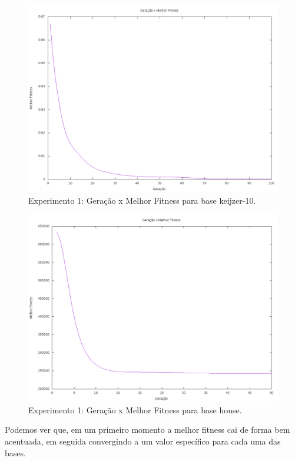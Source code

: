 \documentclass[12pt]{article}
\begin{document}
\begin{figure}[ht]
  \centering
  \includegraphics[width=1\textwidth]{exp1k10.png}
  \caption{Experimento 1: Geração x Melhor Fitness para base keijzer-10.}
  \label{fig:exp1k10}
\end{figure}

\begin{figure}[ht]
  \centering
  \includegraphics[width=1\textwidth]{exp1h.png}
  \caption{Experimento 1: Geração x Melhor Fitness para base house.}
  \label{fig:exp1h}
\end{figure}
  
Podemos ver que, em um primeiro momento a melhor fitness cai de forma bem acentuada,
em seguida convergindo a um valor específico para cada uma das bases.
\end{document}
